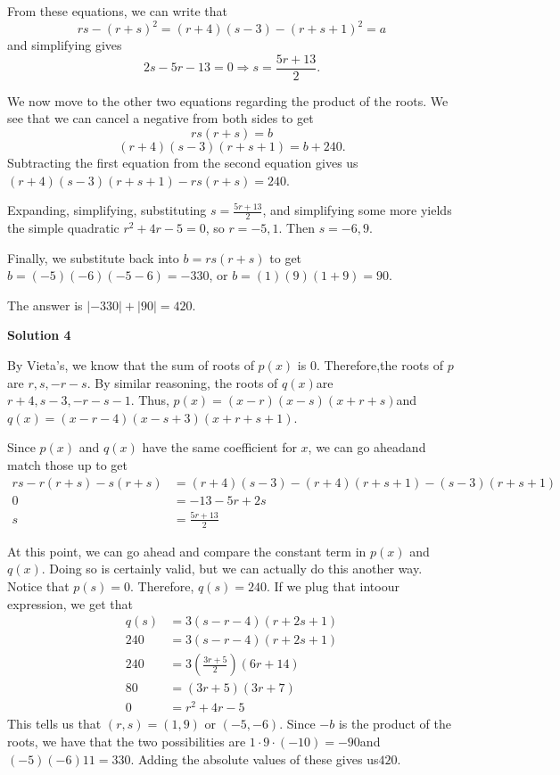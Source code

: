 \begin{enumerate}
 From these equations, we can write that 
 \[rs-(r+s)^2 = (r+4)(s-3)-(r+s+1)^2 = a\]and simplifying gives 
 \[2s-5r-13=0 \Rightarrow s = \frac{5r+13}{2}.\]

 


 We now move to the other two equations regarding the product of the roots. We see that we can cancel a negative from both sides to get 
 \[rs(r+s) = b\] 
 \[(r+4)(s-3)(r+s+1)=b + 240.\] Subtracting the first equation from the second equation gives us $(r+4)(s-3)(r+s+1) - rs(r+s) = 240$. 

 Expanding, simplifying, substituting $s = \frac{5r+13}{2}$, and simplifying some more yields the simple quadratic $r^2 + 4r - 5 = 0$, so $r = -5, 1$. Then $s = -6, 9$. 

 Finally, we substitute back into $b=rs(r+s)$ to get $b = (-5)(-6)(-5-6) = -330$, or $b = (1)(9)(1 + 9) = 90$. 

 The answer is $|-330|+|90| = \boxed{420}$.

 



\textbf{Solution 4}

By Vieta's, we know that the sum of roots of $p(x)$ is $0$. Therefore,the roots of $p$ are $r, s, -r-s$. By similar reasoning, the roots of $q(x)$are $r + 4, s - 3, -r - s - 1$. Thus, $p(x) = (x - r)(x - s)(x + r + s)$and $q(x) = (x - r - 4)(x - s + 3)(x + r + s + 1)$.

 Since $p(x)$ and $q(x)$ have the same coefficient for $x$, we can go aheadand match those up to get
 \begin{align*}     rs - r(r + s) - s(r + s) &= (r + 4)(s - 3) - (r + 4)(r + s + 1) - (s - 3)(r + s + 1) \\     0 &= -13 - 5r + 2s \\     s &= \frac{5r + 13}{2} \end{align*}


 At this point, we can go ahead and compare the constant term in $p(x)$ and$q(x)$. Doing so is certainly valid, but we can actually do this another way. Notice that $p(s) = 0$. Therefore, $q(s) = 240$. If we plug that intoour expression, we get that
 \begin{align*}     q(s)  &= 3(s - r - 4)(r + 2s + 1) \\     240 &= 3(s - r - 4)(r + 2s + 1) \\     240 &= 3\left( \frac{3r + 5}{2} \right)(6r + 14) \\     80 &= (3r + 5)(3r + 7) \\     0 &= r^2 + 4r - 5 \end{align*}
This tells us that $(r, s) = (1, 9)$ or $(-5, -6)$. Since $-b$ is the product of the roots, we have that the two possibilities are $1 \cdot 9 \cdot (-10) = -90$and $(-5)(-6)11 = 330$. Adding the absolute values of these gives us$\boxed{420}$.


\end{enumerate}
